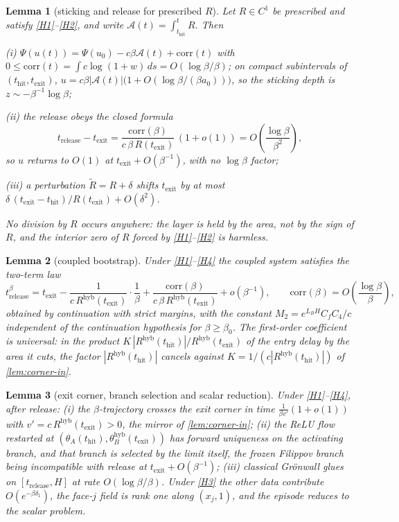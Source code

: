\documentclass[11pt]{article}
\newtheorem{lemma}[lemma]{Lemma}
\theoremstyle{definition}
\theoremstyle{remark}
\newcommand{\thit}{t_{\mathrm{hit}}}
\newcommand{\texit}{t_{\mathrm{exit}}}
\newcommand{\trel}{t_{\mathrm{release}}}
\newcommand{\Ar}{\mathcal{A}}                      %
\newcommand{\hyb}{\mathrm{hyb}}
\begin{document}
\begin{lemma}[sticking and release for prescribed $R$]\label{lem:release}
Let $R\in C^1$ be prescribed and satisfy \eqref{H1}--\eqref{H2}, and write
$\Ar(t)=\int_{\thit}^{t}R$. Then

(i) $\Psi(u(t))=\Psi(u_0)-c\beta\Ar(t)+\mathrm{corr}(t)$ with
$0\le\mathrm{corr}(t)=\int c\log(1+w)\,ds=O(\log\beta/\beta)$; on compact
subintervals of $(\thit,\texit)$,
$u=c\beta|\Ar(t)|\bigl(1+O(\log\beta/(\beta a_0))\bigr)$, so the sticking depth is
$z\sim-\beta^{-1}\log\beta$;

(ii) the release obeys the closed formula
\begin{equation}\label{eq:release-prescribed}
\trel-\texit=\frac{\mathrm{corr}(\beta)}{c\,\beta\,R(\texit)}\,(1+o(1))
=O\!\left(\frac{\log\beta}{\beta^{2}}\right),
\end{equation}
so $u$ returns to $O(1)$ at $\texit+O(\beta^{-1})$, with no $\log\beta$ factor;

(iii) a perturbation $\tilde R=R+\delta$ shifts $\texit$ by at most
$\delta\,(\texit-\thit)/R(\texit)+O(\delta^{2})$.

No division by $R$ occurs anywhere: the layer is held by the area, not by the
sign of $R$, and the interior zero of $R$ forced by \eqref{H1}--\eqref{H2} is
harmless.
\end{lemma}

\begin{lemma}[coupled bootstrap]\label{lem:bootstrap}
Under \eqref{H1}--\eqref{H4} the coupled system satisfies the two-term law
\begin{equation}\label{eq:twoterm}
t^\beta_{\mathrm{release}}
=\texit-\frac{1}{c\,R^{\hyb}(\texit)}\cdot\frac{1}{\beta}
+\frac{\mathrm{corr}(\beta)}{c\,\beta\,R^{\hyb}(\texit)}+o(\beta^{-1}),
\qquad \mathrm{corr}(\beta)=O\!\left(\frac{\log\beta}{\beta}\right),
\end{equation}
obtained by continuation with strict margins, with the constant
$M_2=e^{L_BH}C_fC_4/c$ independent of the continuation hypothesis for
$\beta\ge\beta_0$. The first-order coefficient is universal: in the product
$K\,|R^{\hyb}(\thit)|/R^{\hyb}(\texit)$ of the entry delay by the area it cuts,
the factor $|R^{\hyb}(\thit)|$ cancels against $K=1/(c|R^{\hyb}(\thit)|)$ of
\cref{lem:corner-in}.
\end{lemma}

\begin{lemma}[exit corner, branch selection and scalar reduction]\label{lem:corner-out}
Under \eqref{H1}--\eqref{H4}, after release: (i) the $\beta$-trajectory crosses
the exit corner in time $\tfrac{1}{\beta v'}(1+o(1))$ with
$v'=c\,R^{\hyb}(\texit)>0$, the mirror of \cref{lem:corner-in}; (ii) the ReLU flow
restarted at $(\theta_A(\thit),\theta_B^{\hyb}(\texit))$ has forward uniqueness on
the activating branch, and that branch is selected by the limit itself, the
frozen Filippov branch~\cite{Fil88} being incompatible with release at
$\texit+O(\beta^{-1})$; (iii) classical Gr\"onwall glues on $[\trel,H]$ at rate
$O(\log\beta/\beta)$. Under \eqref{H3} the other data contribute
$O(e^{-\beta\delta_1})$, the face-$j$ field is rank one along $(x_j,1)$, and the
episode reduces to the scalar problem.
\end{lemma}
\end{document}
